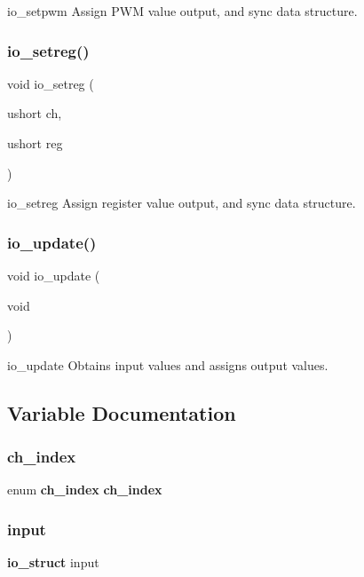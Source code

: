 io\+\_\+setpwm Assign P\+WM value output, and sync data structure. \mbox{\label{io_8h_ac46d8aef8b4048ef2b6508d0e96190a1}} 
\subsubsection{io\+\_\+setreg()}
{\footnotesize\ttfamily void io\+\_\+setreg (\begin{DoxyParamCaption}\item[{ushort}]{ch,  }\item[{ushort}]{reg }\end{DoxyParamCaption})}

io\+\_\+setreg Assign register value output, and sync data structure. \mbox{\label{io_8h_ae61292b63ed2e10396f8c35bcdaf8986}} 
\subsubsection{io\+\_\+update()}
{\footnotesize\ttfamily void io\+\_\+update (\begin{DoxyParamCaption}\item[{void}]{ }\end{DoxyParamCaption})}

io\+\_\+update Obtains input values and assigns output values. 

\subsection{Variable Documentation}
\mbox{\label{io_8h_ac79ebe75690f7175a1eff43c19ece978}} 
\subsubsection{ch\+\_\+index}
{\footnotesize\ttfamily enum \textbf{ ch\+\_\+index}  \textbf{ ch\+\_\+index}}

\mbox{\label{io_8h_a808174e110a785849e8ec755a0dd9762}} 
\subsubsection{input}
{\footnotesize\ttfamily \textbf{ io\+\_\+struct} input}

